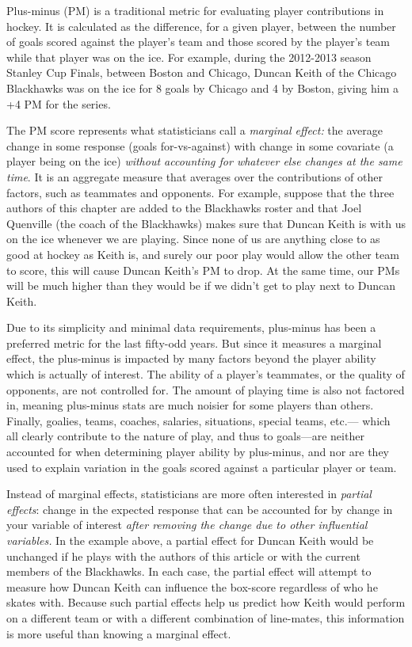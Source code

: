 Plus-minus (PM) is a traditional metric for evaluating player contributions in
hockey. It is calculated as the difference, for a given player, between the
number of goals scored against the player's team and those scored by the
player's team while that player was on the ice.  For example, during the
2012-2013 season Stanley Cup Finals, between Boston and Chicago, Duncan Keith
of the Chicago Blackhawks was on the ice for 8 goals by Chicago and 4 by
Boston, giving him a +4 PM for the series.

The PM score represents what statisticians call a \textit{marginal effect:}
the average change in some response (goals for-vs-against) with change in some
covariate (a player being on the ice) \textit{without accounting for whatever
else changes at the same time}. It is an aggregate measure that averages over
the contributions of other factors, such as teammates and opponents.   For
example, suppose that the three authors of this chapter are added to the
Blackhawks roster and that Joel Quenville (the coach of the Blackhawks) makes
sure that Duncan Keith is with us on the ice whenever we are playing.  Since
none of us are anything close to as good at hockey as Keith is, and surely our
poor play would allow the other team to score, this will cause Duncan Keith's
PM to drop.  At the same time, our PMs will be much higher than they would be
if we didn't get to play next to Duncan Keith.

Due to its simplicity and
minimal data requirements, plus-minus has been a preferred metric for the last
fifty-odd years.  But since it measures a marginal effect, the plus-minus is
impacted by many factors beyond the player ability which is actually of
interest.  The ability of a player's teammates, or the quality of opponents,
are not controlled for.  The amount of playing time is also not factored in,
meaning plus-minus stats are much noisier for some players than others.
Finally, goalies, teams, coaches, salaries, situations, special teams, etc.---
which all clearly contribute to the nature of play, and thus to goals---are
neither accounted for when determining player ability by plus-minus, and nor
are they used to explain variation in the goals scored against a particular
player or team.

Instead of marginal effects, statisticians are more often interested in
\textit{partial effects}: change in the expected response that can be
accounted for by change in your variable of interest \textit{after removing
the change due to other influential variables.} In the example above, a
partial effect for Duncan Keith would be unchanged if he plays with the
authors of this article or with the current members of the Blackhawks.  In
each case, the partial effect will attempt to measure how Duncan Keith can
influence the box-score regardless of who he skates with. Because such partial
effects help us predict how Keith would perform on a different team or with a
different combination of line-mates, this information is more useful than
knowing a marginal effect.

